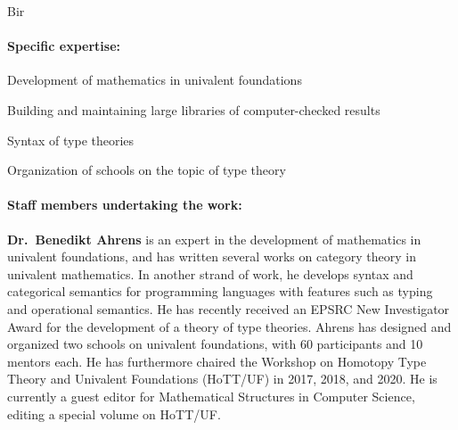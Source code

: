 \begin{sitedescription}{Bir}

\paragraph{Specific expertise:}

\begin{compactitem}
\item Development of mathematics in univalent foundations
\item Building and maintaining large libraries of computer-checked results
\item Syntax of type theories
\item Organization of schools on the topic of type theory
\item {}
\end{compactitem}

\paragraph{Staff members undertaking the work:}

\textbf{Dr.\ Benedikt Ahrens} is an expert in the development of mathematics in univalent foundations, and has written several works on category theory in univalent mathematics.
In another strand of work, he develops syntax and categorical semantics for programming languages with features such as typing and operational semantics.
He has recently received an EPSRC New Investigator Award for the development of a theory of type theories.
Ahrens has designed and organized two schools on univalent foundations, with 60 participants and 10 mentors each. He has furthermore chaired the Workshop on Homotopy Type Theory and Univalent Foundations (HoTT/UF) in 2017, 2018, and 2020. He is currently a guest editor for Mathematical Structures in Computer Science, editing a special volume on HoTT/UF.







\end{sitedescription}

